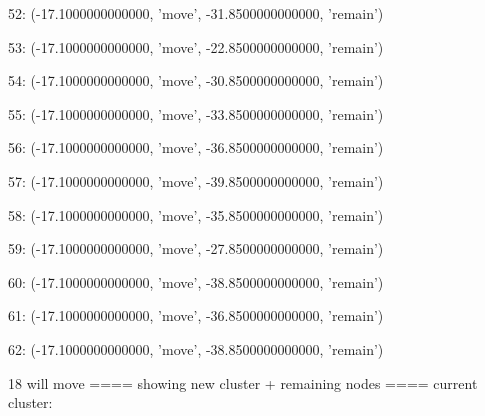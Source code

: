 52: (-17.1000000000000, 'move', -31.8500000000000, 'remain')


53: (-17.1000000000000, 'move', -22.8500000000000, 'remain')


54: (-17.1000000000000, 'move', -30.8500000000000, 'remain')


55: (-17.1000000000000, 'move', -33.8500000000000, 'remain')


56: (-17.1000000000000, 'move', -36.8500000000000, 'remain')


57: (-17.1000000000000, 'move', -39.8500000000000, 'remain')


58: (-17.1000000000000, 'move', -35.8500000000000, 'remain')


59: (-17.1000000000000, 'move', -27.8500000000000, 'remain')


60: (-17.1000000000000, 'move', -38.8500000000000, 'remain')


61: (-17.1000000000000, 'move', -36.8500000000000, 'remain')


62: (-17.1000000000000, 'move', -38.8500000000000, 'remain')


18 will move
==== showing new cluster + remaining nodes ====
current cluster:


